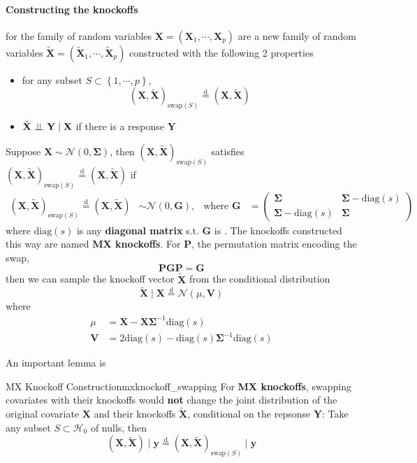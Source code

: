\documentclass[twoside]{article}
\begin{document}
\paragraph*{Constructing the knockoffs} for the family of random variables $\mathbf{X}=(\mathbf{X}_1,\cdots,\mathbf{X}_p)$ are a new family of random variables $\tilde{\mathbf{X}} = (\tilde{\mathbf{X}}_1,\cdots,\tilde{\mathbf{X}}_p)$ constructed with the following 2 properties
\begin{itemize}
    \item for any subset $S \subset \left\{1,\cdots,p \right\}$, $$ (\mathbf{X},\tilde{\mathbf{X}})_{\mathrm{swap}(S)} \overset{\mathrm{d}}{=}(\mathbf{X},\tilde{\mathbf{X}}) $$
    \item $\tilde{\mathbf{X}} \perp\!\!\!\perp \mathbf{Y}\mid \mathbf{X}$ if there is a response $\mathbf{Y}$
\end{itemize}
Suppose $\mathbf{X}\sim \mathcal{N}(0,\boldsymbol{\Sigma})$, then $(\mathbf{X},\tilde{\mathbf{X}})_{\mathrm{swap}(S)}$ satisfies $ (\mathbf{X},\tilde{\mathbf{X}})_{\mathrm{swap}(S)} \overset{\mathrm{d}}{=}(\mathbf{X},\tilde{\mathbf{X}}) $ if 
\begin{align*}
    (\mathbf{X},\tilde{\mathbf{X}})_{\mathrm{swap}(S)} \overset{\mathrm{d}}{=}(\mathbf{X},\tilde{\mathbf{X}}) &\sim \mathcal{N}(0,\mathbf{G}), & \text{where } \mathbf{G}&=\begin{pmatrix}
        \boldsymbol{\Sigma} & \boldsymbol{\Sigma}-\mathrm{diag}(s)\\
        \boldsymbol{\Sigma}-\mathrm{diag}(s) & \boldsymbol{\Sigma}
    \end{pmatrix}
\end{align*}
where $\mathrm{diag}(s)$ is any \textbf{diagonal matrix} s.t. $\boldsymbol{G}$ is . The knockoffs constructed this way are named \textbf{MX knockoffs}. For $\mathbf{P}$, the permutation matrix encoding the swap,
$$
\mathbf{PGP} = \mathbf{G}
$$
then we can sample the knockoff vector $\tilde{\mathbf{X}}$ from the conditional distribution
$$
\tilde{\mathbf{X}} \mid \mathbf{X} \overset{\mathrm{d}}{=}\mathcal{N}(\mu,\mathbf{V})
$$
where 
\begin{align*}
    \mu &= \mathbf{X} - \mathbf{X}\boldsymbol{\Sigma}^{-1}\mathrm{diag}(s)\\
    \mathbf{V} &= 2\mathrm{diag}(s) - \mathrm{diag}(s)\boldsymbol{\Sigma}^{-1}\mathrm{diag}(s)
\end{align*}

An important lemma is
\begin{lemma}{MX Knockoff Construction}{mxknockoff_swapping}
    For {\textbf{MX knockoffs}}, swapping  covariates with their knockoffs would \textbf{not} change the joint distribution of the original covariate $\mathbf{X}$ and their knockoffs $\tilde{\mathbf{X}}$, conditional on the repsonse $\mathbf{Y}$: Take any subset $S\subset \mathcal{H}_0$ of nulls, then
    $$
    \left( \mathbf{X},\tilde{\mathbf{X}} \right)\mid \mathbf{y} \overset{\mathrm{d}}{=} \left(\mathbf{X},\tilde{\mathbf{X}}\right)_{\mathrm{swap}(S)}\mid \mathbf{y}
    $$
\end{lemma}
\end{document}
